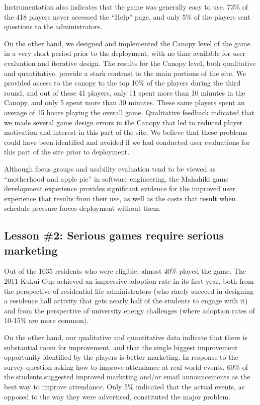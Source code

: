 \documentclass{acm_proc_article-sp}
\begin{document}
Instrumentation also indicates that the game was generally easy to
use. 73\% of the 418 players never accessed the ``Help'' page, and only 5\%
of the players sent questions to the administrators.

On the other hand, we designed and implemented the Can\-opy level of the
game in a very short period prior to the deployment, with no time available
for user evaluation and iterative design.  The results for the Canopy
level, both qualitative and quantitative, provide a stark contrast to the
main portions of the site.  We provided access to the canopy to the top
10\% of the players during the third round, and out of these 41 players,
only 11 spent more than 10 minutes in the Canopy, and only 5 spent more
than 30 minutes. These same players spent an average of 15 hours playing the
overall game.  Qualitative feedback indicated that we made several game
design errors in the Canopy that led to reduced player motivation and
interest in this part of the site.  We believe that these problems could
have been identified and avoided if we had conducted user evaluations for
this part of the site prior to deployment.

Although focus groups and usability evaluation tend to be viewed as
``motherhood and apple pie'' in software engineering, the Mahahiki game
development experience provides significant evidence for the improved user
experience that results from their use, as well as the costs that result
when schedule pressure forces deployment without them.

\subsection{Lesson \#2: Serious games require serious marketing}

Out of the 1035 residents who were eligible, almost 40\% played the game. The
2011 Kukui Cup achieved an impressive adoption rate in its first year, both
from the perspective of residential life administrators (who rarely succeed in
designing a residence hall activity that gets nearly half of the students to
engage with it) and from the perspective of university energy challenges (where
adoption rates of 10-15\% are more common).

On the other hand, our qualitative and quantitative data indicate that
there is substantial room for improvement, and that the single biggest
improvement opportunity identified by the players is better marketing.  In
response to the survey question asking how to improve attendance at real
world events, 60\% of the students suggested improved marketing and/or email
announcements as the best way to improve attendance.  Only 5\% indicated
that the actual events, as opposed to the way they were advertised,
constituted the major problem.
\end{document}
